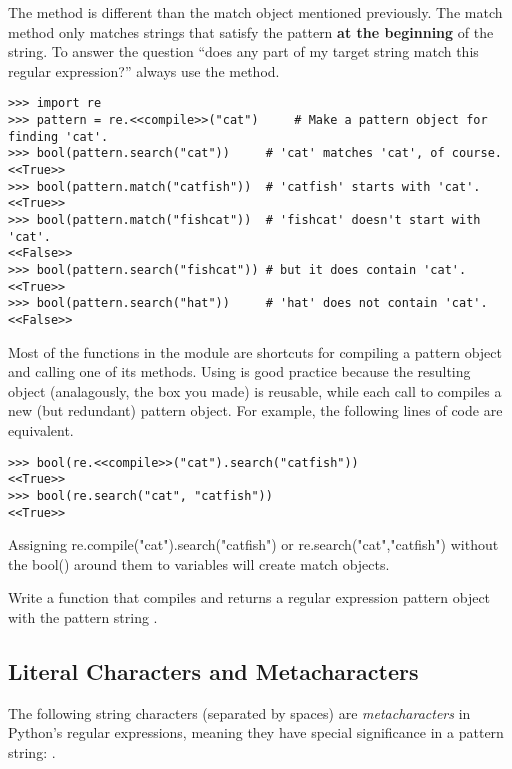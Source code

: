 The  method is different than the match object mentioned previously. The match method only matches strings that satisfy the pattern \textbf{at the beginning} of the string.
To answer the question ``does any part of my target string match this regular expression?'' always use the  method.

\begin{lstlisting}
>>> import re
>>> pattern = re.<<compile>>("cat")     # Make a pattern object for finding 'cat'.
>>> bool(pattern.search("cat"))     # 'cat' matches 'cat', of course.
<<True>>
>>> bool(pattern.match("catfish"))  # 'catfish' starts with 'cat'.
<<True>>
>>> bool(pattern.match("fishcat"))  # 'fishcat' doesn't start with 'cat'.
<<False>>
>>> bool(pattern.search("fishcat")) # but it does contain 'cat'.
<<True>>
>>> bool(pattern.search("hat"))     # 'hat' does not contain 'cat'.
<<False>>
\end{lstlisting}

Most of the functions in the  module are shortcuts for compiling a pattern object and calling one of its methods.
Using  is good practice because the resulting object (analagously, the box you made) is reusable, while each call to  compiles a new (but redundant) pattern object.
For example, the following lines of code are equivalent.
\begin{lstlisting}
>>> bool(re.<<compile>>("cat").search("catfish"))
<<True>>
>>> bool(re.search("cat", "catfish"))
<<True>>
\end{lstlisting}
\raggedright
Assigning re.compile("cat").search("catfish") or re.search("cat","catfish") without the bool() around them to variables will create match objects.

\begin{problem} %
Write a function that compiles and returns a regular expression pattern object with the pattern string .
\label{prob:regex-superbasic}
\end{problem}

\subsection*{Literal Characters and Metacharacters} %

The following string characters (separated by spaces) are \emph{metacharacters} in Python's regular expressions, meaning they have special significance in a pattern string:
.

